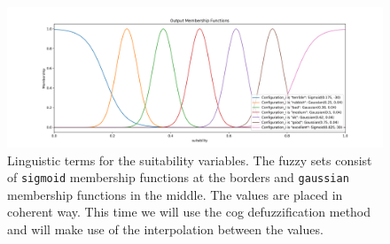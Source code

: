 \begin{figure}[H]
    \centering
    \includegraphics[width=\columnwidth,trim={1cm 0 2cm 1.5cm},clip]{figures/DataAnalytics/membership_suitability_config.png}
    \caption[Linguistic variable for the Suitability attribute]{
        Linguistic terms for the suitability variables. The fuzzy sets consist of  \texttt{sigmoid} membership functions at the borders and \texttt{gaussian} membership functions in the middle. The values are placed in coherent way. This time we will use the \gls{cog} defuzzification method and will make use of the interpolation between the values.
    }
    \label{fig:suitabilityClasses}
\end{figure}


